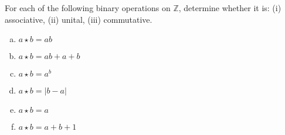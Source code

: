 \begin{chapex}
For each of the following binary operations on $\mathbb{Z}$, determine whether it is: (i) associative, (ii) unital, (iii) commutative.
\begin{multicols}{2}
\begin{enumerate}[(a)]
\item $a \star b = ab$
\item $a \star b = ab + a + b$
\item $a \star b = a^b$
\item $a \star b = |b - a|$
\item $a \star b = a$
\item $a \star b = a + b + 1$
\end{enumerate}
\end{multicols}
\end{chapex}